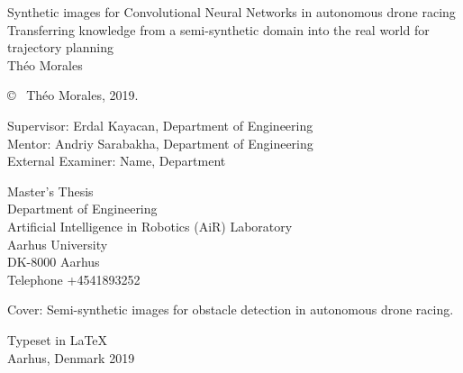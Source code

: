 \newpage
\thispagestyle{plain}
\vspace*{4.5cm}
Synthetic images for Convolutional Neural Networks in autonomous
drone racing\\
Transferring knowledge from a semi-synthetic domain into the real world for
trajectory planning\\
Théo Morales \setlength{\parskip}{1cm}

\copyright ~ Théo Morales, 2019. \setlength{\parskip}{1cm}

Supervisor: Erdal Kayacan, Department of Engineering\\
Mentor: Andriy Sarabakha, Department of Engineering\\
External Examiner: Name, Department \setlength{\parskip}{1cm}

Master's Thesis\\	%
Department of Engineering\\
Artificial Intelligence in Robotics (AiR) Laboratory\\
Aarhus University\\
DK-8000 Aarhus\\
Telephone +4541893252 \setlength{\parskip}{0.5cm}

\vfill
Cover: Semi-synthetic images for obstacle detection in autonomous drone racing. \setlength{\parskip}{0.5cm}

Typeset in \LaTeX \\
Aarhus, Denmark 2019

